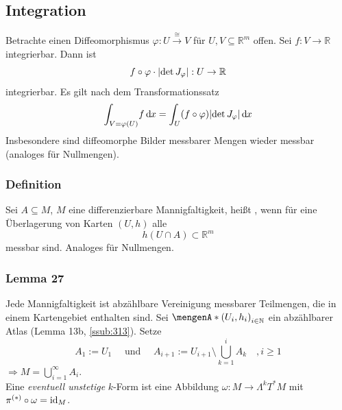 \subsection{Integration} %
\label{sub:55}
Betrachte einen Diffeomorphismus $\varphi : U \xrightarrow{\cong} V $ für $U,V \subseteq \mathds{R}^m$ offen. Sei $f : V \to \mathds{R}$ integrierbar. Dann ist
\[
	f \circ \varphi \cdot \abs*{\det J_\varphi} : U \to \mathds{R} 
\]
integrierbar. Es gilt nach dem Transformationssatz
\[
	\int_{V= \varphi(U)} \! f  \, \mathd x = \int_{U} (f \circ \varphi) \abs*{\det J_\varphi}  \, \mathd x  
\]
Insbesondere sind diffeomorphe Bilder messbarer Mengen wieder messbar (analoges für Nullmengen).

\subsubsection[Definition: Messbare Teilmenge einer Mannigfaltigkeit]{Definition} %
\label{ssub:551}
Sei $A \subseteq M$, $M$ eine differenzierbare Mannigfaltigkeit, heißt , wenn für eine Überlagerung von Karten $(U,h)$ alle 
\[
	h(U \cap A) \subset \mathds{R}^m
\] 
messbar sind. Analoges für Nullmengen.

\subsubsection{Lemma 27} %
\label{ssub:552}
Jede Mannigfaltigkeit ist abzählbare Vereinigung messbarer Teilmengen, die in einem Kartengebiet enthalten sind.
Sei $\set{(U_i, h_i)}_{i \in \mathds{N}} $ ein abzählbarer Atlas (Lemma 13b, \ref{ssub:313}). Setze
\[
	A_1 := U_1 \quad \text{ und } \quad A_{i+1} := U_{i+1} \setminus \bigcup_{k=1}^i A_k \quad , i \ge 1
\]
$\Rightarrow M= \bigcup_{i=1}^\infty A_i$. \bewende \bigskip \\
Eine \emph{eventuell unstetige} $k$-Form ist eine Abbildung $\omega : M \to \Lambda^k T^* M$ mit $\pi^{(*)} \circ \omega = \id_M$.

